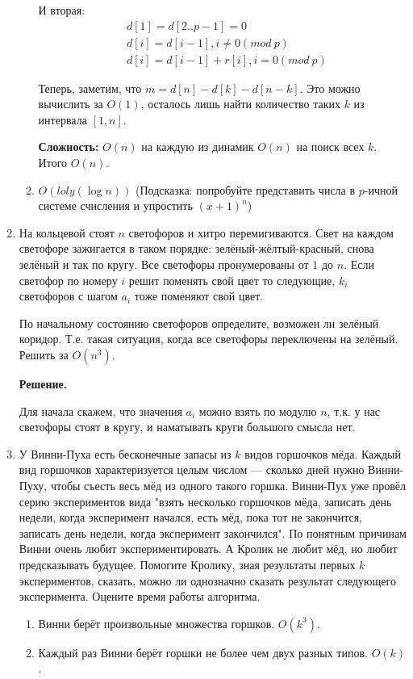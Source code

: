 \begin{enumerate}
\begin{enumerate}
		И вторая:
		\begin{align*}
		&d[1] = d[2..p-1] = 0 \\
		&d[i] = d[i - 1], i \neq 0 (mod \ p) \\
		&d[i] = d[i - 1] + r[i], i = 0(mod \ p)
		\end{align*}
		
		Теперь, заметим, что $m = d[n] - d[k] - d[n - k]$. Это можно вычислить за $O(1)$, осталось лишь найти количество таких $k$ из интервала $[1, n]$. 
		
		\textbf{Сложность:} $O(n)$ на каждую из динамик $O(n)$ на поиск всех $k$. Итого $O(n)$.
		
		\item $O(loly(\log n))$ (Подсказка: попробуйте представить числа в $p$-ичной системе счисления и упростить $(x + 1)^n$)
	\end{enumerate}
	
	\item На кольцевой стоят $n$ светофоров и хитро перемигиваются. Свет на каждом светофоре зажигается в таком 
	порядке: зелёный-жёлтый-красный, снова зелёный и так по кругу. Все светофоры пронумерованы от $1$ до $n$. Если 
	светофор по номеру $i$ решит поменять свой цвет то следующие, $k_i$ светофоров с шагом $a_i$ тоже поменяют свой 
	цвет.
	
	По начальному состоянию светофоров определите, возможен ли зелёный коридор. Т.е. такая ситуация, когда все 
	светофоры переключены на зелёный. Решить за $O(n^3)$.
	
	\textbf{Решение.}
	
	Для начала скажем, что значения $a_i$ можно взять по модулю $n$, т.к. у нас светофоры стоят в кругу, и наматывать круги большого смысла нет.

	\item У Винни-Пуха есть бесконечные запасы из $k$ видов горшочков мёда. Каждый вид горшочков характеризуется 
	целым числом — сколько дней нужно Винни-Пуху, чтобы съесть весь мёд из одного такого горшка. Винни-Пух уже 
	провёл серию экспериментов вида "взять несколько горшочков мёда, записать день недели, когда эксперимент 
	начался, есть мёд, пока тот не закончится, записать день недели, когда эксперимент закончился". По понятным 
	причинам Винни очень любит экспериментировать. А Кролик не любит мёд, но любит предсказывать будущее. Помогите 
	Кролику, зная результаты первых $k$ экспериментов, сказать, можно ли однозначно сказать результат следующего 
	эксперимента. Оцените время работы алгоритма.
	\begin{enumerate}
		\item Винни берёт произвольные множества горшков. $O(k^3)$.
		\item Каждый раз Винни берёт горшки не более чем двух разных типов. $O(k)$.
	\end{enumerate}
	
\end{enumerate}
	
